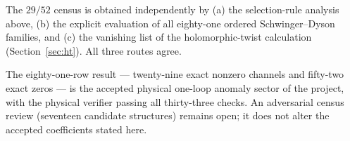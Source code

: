 \begin{remark}\label{rem:ss:threeroutes}
The $29/52$ census is obtained independently by (a) the selection-rule
analysis above, (b) the explicit evaluation of all eighty-one ordered
Schwinger--Dyson families, and (c) the vanishing list of the holomorphic-twist
calculation \cite{BK} (Section~\ref{sec:ht}). All three routes agree.
\end{remark}

\begin{remark}[Status]\label{rem:ss:status}
The eighty-one-row result --- twenty-nine exact nonzero channels and fifty-two
exact zeros --- is the accepted physical one-loop anomaly sector of the
project, with the physical verifier passing all thirty-three checks. An
adversarial census review (seventeen candidate structures) remains open; it
does not alter the accepted coefficients stated here.
\end{remark}

